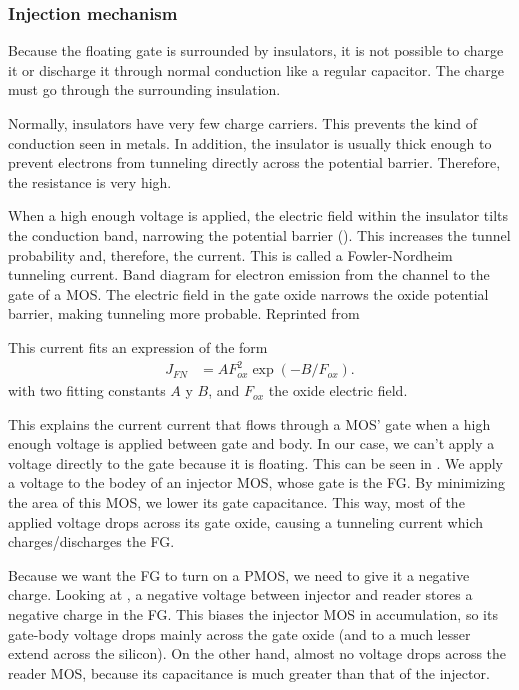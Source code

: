 {\subsubsection{Injection mechanism}
Because the floating gate is surrounded by insulators,
it is not possible to charge it or discharge it through normal conduction
like a regular capacitor.
The charge must go through the surrounding insulation.

Normally, insulators have very few charge carriers.
This prevents the kind of conduction seen in metals.
In addition, the insulator is usually thick enough
to prevent electrons from tunneling directly across the potential barrier.
Therefore, the resistance is very high.

When a high enough voltage is applied,
the electric field within the insulator tilts the conduction band,
narrowing the potential barrier
().
This increases the tunnel probability and, therefore, the current.
This is called a
Fowler-Nordheim tunneling current\cite{lenzlinger_fowlernordheim_1969}.
{Band diagram for electron emission from the channel to the gate of a MOS.
The electric field in the gate oxide narrows the oxide potential barrier,
making tunneling more probable.
Reprinted from \cite{lenzlinger_fowlernordheim_1969}}

This current fits an expression of the form
\begin{align*}
    J_{FN} &= AF_{ox}^2\exp(-B/F_{ox}).
\end{align*}
with two fitting constants $A$ y $B$,
and $F_{ox}$ the oxide electric field.

This explains the current current that flows through a MOS' gate
when a high enough voltage is applied between gate and body.
In our case, we can't apply a voltage directly to the gate because it is floating.
This can be seen in .
We apply a voltage to the bodey of an injector MOS,
whose gate is the FG.
By minimizing the area of this MOS,
we lower its gate capacitance.
This way, most of the applied voltage drops across its gate oxide,
causing a tunneling current which charges/discharges the FG.

Because we want the FG to turn on a PMOS,
we need to give it a negative charge.
Looking at ,
a negative voltage between injector and reader
stores a negative charge in the FG.
This biases the injector MOS in accumulation,
so its gate-body voltage drops mainly across the gate oxide
(and to a much lesser extend across the silicon).
On the other hand, almost no voltage drops across the reader MOS,
because its capacitance is much greater than that of the injector.

}
